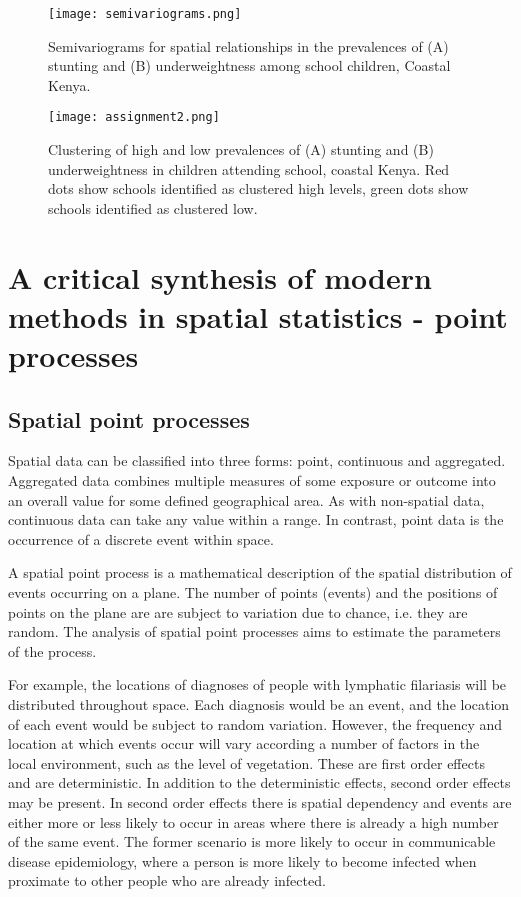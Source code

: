 \documentclass[11pt,a4paper,twoside]{article}\usepackage[]{graphicx}\usepackage[]{color}
\begin{document}
\begin{sidewaysfigure}[H]
\texttt{[image: semivariograms.png]}
\caption{Semivariograms for spatial relationships in the prevalences of (A) stunting  and (B) underweightness among school children, Coastal Kenya.}
\label{semi}
\end{sidewaysfigure}
\clearpage

\begin{sidewaysfigure}[H]
\texttt{[image: assignment2.png]}
\caption{Clustering of high and low prevalences of (A) stunting and (B) underweightness in children attending school, coastal Kenya. Red dots show schools identified as clustered high levels, green dots show schools identified as clustered low.}
\label{cluster_map}
\end{sidewaysfigure}
\clearpage

\section{A critical synthesis of modern methods in spatial statistics - point processes}
\subsection{Spatial point processes}
Spatial data can be classified into three forms: point, continuous and aggregated. 
Aggregated data combines multiple measures of some exposure or outcome into an overall value for some defined geographical area. 
As with non-spatial data, continuous data can take any value within a range. 
In contrast, point data is the occurrence of a discrete event within space. 

A spatial point process is a mathematical description of the spatial distribution of events occurring on a plane. 
The number of points (events) and the positions of points on the plane are are subject to variation due to chance, i.e. they are random. 
The analysis of spatial point processes aims to estimate the parameters of the process. 

For example, the locations of diagnoses of people with lymphatic filariasis will be distributed throughout space. 
Each diagnosis would be an event, and the location of each event would be subject to random variation. 
However, the frequency and location at which events occur will vary according a number of factors in the local environment, such as the level of vegetation. \cite{Stensgaard2011}
These are first order effects and are deterministic. 
In addition to the deterministic effects, second order effects may be present. 
In second order effects there is spatial dependency and events are either more or less likely to occur in areas where there is already a high number of the same event. 
The former scenario is more likely to occur in communicable disease epidemiology, where a person is more likely to become infected when proximate to other people who are already infected. 
\end{document}
